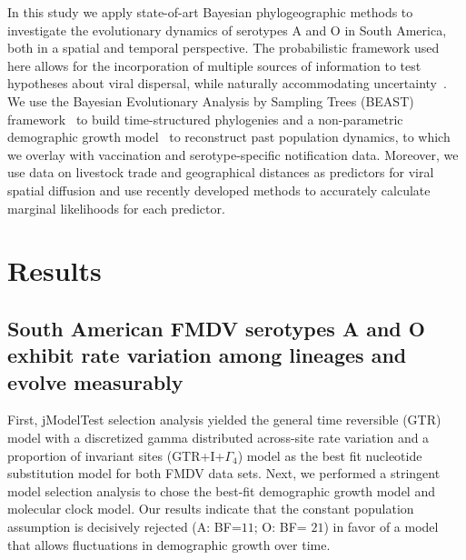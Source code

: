 \documentclass[10pt]{article}
\begin{document}
In this study we apply state-of-art Bayesian phylogeographic methods to investigate the evolutionary dynamics of serotypes A and O in South America, both in a spatial and temporal perspective.
The probabilistic framework used here allows for the incorporation of multiple sources of information to test hypotheses about viral dispersal, while naturally accommodating uncertainty~\cite{roots,towards}.
We use the Bayesian Evolutionary Analysis by Sampling Trees (BEAST) framework~\cite{beast2012} to build time-structured phylogenies and a non-parametric demographic growth model~\cite{skyride} to reconstruct past population dynamics, to which we overlay with vaccination and serotype-specific notification data.
Moreover, we use data on livestock trade and geographical distances as predictors for viral spatial diffusion and use recently developed methods to accurately calculate marginal likelihoods for each predictor.

\section*{Results}

\subsection*{South American FMDV serotypes A and O exhibit rate variation among lineages and evolve measurably}


First, jModelTest selection analysis yielded the general time reversible (GTR) model with a discretized gamma distributed across-site rate variation and a proportion of invariant sites (GTR+I+$\Gamma_{4}$) model as the best fit nucleotide substitution model for both FMDV data sets.
Next, we performed a stringent model selection analysis to chose the best-fit demographic growth model and molecular clock model.
Our results indicate that the constant population assumption is decisively rejected (A: BF=$11$; O: BF= $21$) in favor of a model that allows fluctuations in demographic growth over time. 
\end{document}
